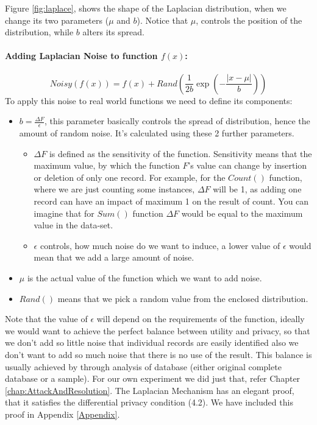 \documentclass[12pt]{report}
\theoremstyle{named}
\begin{document}
Figure \ref{fig:laplace}, shows the shape of the Laplacian distribution, when we change its two parameters ($\mu$ and $b$). Notice that $\mu$, controls the position of the distribution, while $b$ alters its spread.

\paragraph{Adding Laplacian Noise to function $f(x)$:\\}
\begin{equation}
Noisy(f(x)) =f(x) + Rand( \frac{1}{2b} \exp(-\frac{\left | x-\mu  \right |}{b}))
\end{equation}
To apply this noise to real world functions we need to define its components:
\begin{itemize}
  \item $b = \frac{\Delta F}{\epsilon} $, this parameter basically controls the spread of distribution, hence the amount of random noise. It's calculated using these 2 further parameters.
  \begin{itemize}
  \item ${\Delta F}$ is defined as the sensitivity of the function. Sensitivity means that the maximum value, by which the function $F$'s value can change by insertion or deletion of only one record. For example, for the $Count()$ function, where we are just counting some instances, $\Delta F$ will be 1, as adding one record can have an impact of maximum 1 on the result of count. You can imagine that for $Sum()$ function $\Delta F$ would be equal to the maximum value in the data-set.
  \item ${\epsilon}$ controls, how much noise do we want to induce, a lower value of $\epsilon$ would mean that we add a large amount of noise.
  \end{itemize}
  \item $\mu$ is the actual value of the function which we want to add noise.
  \item  $Rand()$ means that we pick a random value from the enclosed distribution.
\end{itemize}

Note that the value of $\epsilon$ will depend on the requirements of the function, ideally we would want to achieve the perfect balance between utility and privacy, so that we don't add so little noise that individual records are easily identified also we don't want to add so much noise that there is no use of the result. This balance is usually achieved by through analysis of database (either original complete database or a sample). For our own experiment we did just that, refer Chapter \ref{chap:AttackAndResolution}.
The Laplacian Mechanism has an elegant proof, that it satisfies the differential privacy condition (4.2). We have included this proof in Appendix \ref{Appendix}.
\end{document}
